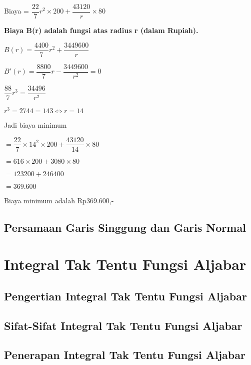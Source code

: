 \documentclass[11pt,fleqn]{book} %
\begin{document}
Biaya =
$\dfrac{22}{7}r^{2} \times 200 + \dfrac{43120}{r} \times 80$

\textbf{Biaya B(r) adalah fungsi atas radius r (dalam Rupiah).}

$B(r) = \dfrac{4400}{7}r^{2} + \dfrac{3449600}{r}$

$B'(r) = \dfrac{8800}{7}r - \dfrac{3449600}{r^{2}} = 0$

$\dfrac{88}{7}r^{3} = \dfrac{34496}{r^{2}}$

$r^{3} = 2744 = 143 \Leftrightarrow r = 14$

Jadi biaya minimum

$= \dfrac{22}{7} \times 14^{2} \times 200 + \dfrac{43120}{14} \times 80$

$= 616 \times 200 + 3080 \times 80$

$= 123200 + 246400$

$= 369.600$

Biaya minimum adalah Rp369.600,-
\section{Persamaan Garis Singgung dan Garis Normal}


\chapter{Integral Tak Tentu Fungsi Aljabar}

\section{Pengertian Integral Tak Tentu Fungsi Aljabar}

\section{Sifat-Sifat Integral Tak Tentu Fungsi Aljabar}

\section{Penerapan Integral Tak Tentu Fungsi Aljabar}
\end{document}
